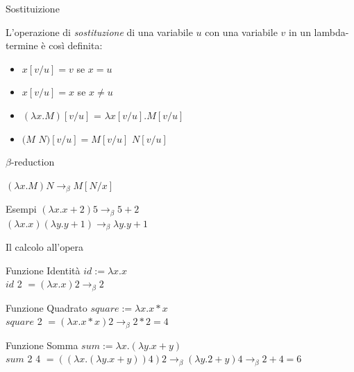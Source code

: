 \documentclass{beamer}
\begin{document}
\begin{frame}{Sostituizione}
\begin{definition}[Sostituzione]
  L'operazione di \textit{sostituzione} di una variabile $u$ con una variabile 
  $v$ in un lambda-termine è così definita:
\begin{itemize}
  \item $x[v/u] = v$ se $x = u$
  \item $x[v/u] = x$ se $x \ne u$
  \item $(\lambda x.M)[v/u]$ = $\lambda x[v/u].M[v/u]$
  \item $(M$ $N)[v/u]=M[v/u]$ $N[v/u]$ 
\end{itemize}

\end{definition}
\end{frame}

\begin{frame}{$\beta$-reduction}
  \begin{definition}
    $(\lambda x . M) N \rightarrow_\beta M[N/x]$ 
  \end{definition}


    \begin{exampleblock}{Esempi}
      $(\lambda x. x + 2) 5 \rightarrow_\beta 5 + 2$ \\
      $(\lambda x . x ) (\lambda y . y + 1) \rightarrow_\beta \lambda y . y + 1$ 
    \end{exampleblock}


  \end{frame}

\begin{frame}{Il calcolo all'opera}

  \begin{minipage}[b]{2\textwidth}
  \begin{exampleblock}{Funzione Identità}
    $id := \lambda x .x $ \\
    $id$ 2 $= (\lambda x .x) 2 \longrightarrow_\beta 2$
  \end{exampleblock}

  \begin{exampleblock}{Funzione Quadrato}
    $square := \lambda x . x * x$ \\
    $square$ 2 $= (\lambda x. x * x) 2 \longrightarrow_\beta 2 * 2 = 4$ \\
  \end{exampleblock}

  \begin{exampleblock}{Funzione Somma}
    $sum := \lambda x .(\lambda y . x + y)$ \\
    $sum$ 2 4 $= ((\lambda x. (\lambda y . x + y))4)2  \longrightarrow_\beta (\lambda y . 2 + y ) 4 \longrightarrow_\beta 2 + 4 = 6$ \\
  \end{exampleblock}
  \end{minipage}
\end{frame}
\end{document}
